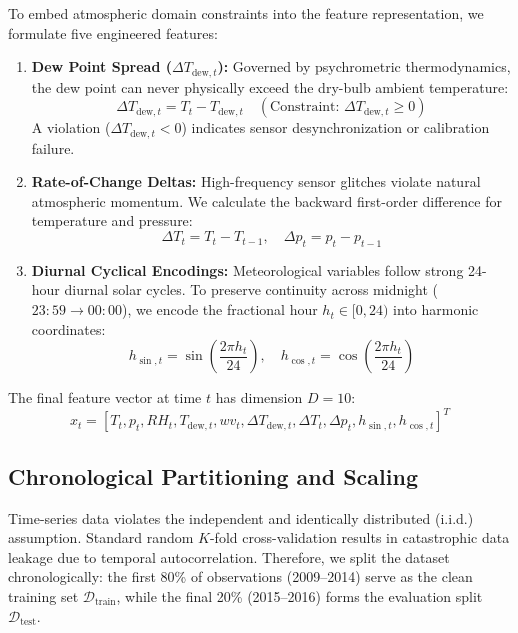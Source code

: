 \documentclass[conference]{IEEEtran}
\begin{document}
To embed atmospheric domain constraints into the feature representation, we formulate five engineered features:
\begin{enumerate}
    \item \textbf{Dew Point Spread ($\Delta T_{\text{dew},t}$):} Governed by psychrometric thermodynamics, the dew point can never physically exceed the dry-bulb ambient temperature:
    \begin{equation}
        \Delta T_{\text{dew},t} = T_t - T_{\text{dew},t} \quad (\text{Constraint: } \Delta T_{\text{dew},t} \ge 0)
    \end{equation}
    A violation ($\Delta T_{\text{dew},t} < 0$) indicates sensor desynchronization or calibration failure.
    \item \textbf{Rate-of-Change Deltas:} High-frequency sensor glitches violate natural atmospheric momentum. We calculate the backward first-order difference for temperature and pressure:
    \begin{equation}
        \Delta T_t = T_t - T_{t-1}, \quad \Delta p_t = p_t - p_{t-1}
    \end{equation}
    \item \textbf{Diurnal Cyclical Encodings:} Meteorological variables follow strong 24-hour diurnal solar cycles. To preserve continuity across midnight ($23:59 \to 00:00$), we encode the fractional hour $h_t \in [0, 24)$ into harmonic coordinates:
    \begin{equation}
        h_{\sin,t} = \sin\left(\frac{2\pi h_t}{24}\right), \quad h_{\cos,t} = \cos\left(\frac{2\pi h_t}{24}\right)
    \end{equation}
\end{enumerate}

The final feature vector at time $t$ has dimension $D = 10$:
\begin{equation}
    x_t = [T_t, p_t, RH_t, T_{\text{dew},t}, wv_t, \Delta T_{\text{dew},t}, \Delta T_t, \Delta p_t, h_{\sin,t}, h_{\cos,t}]^T
\end{equation}

\subsection{Chronological Partitioning and Scaling}
Time-series data violates the independent and identically distributed (i.i.d.) assumption. Standard random $K$-fold cross-validation results in catastrophic data leakage due to temporal autocorrelation. Therefore, we split the dataset chronologically: the first 80\% of observations (2009--2014) serve as the clean training set $\mathcal{D}_{\text{train}}$, while the final 20\% (2015--2016) forms the evaluation split $\mathcal{D}_{\text{test}}$.
\end{document}
